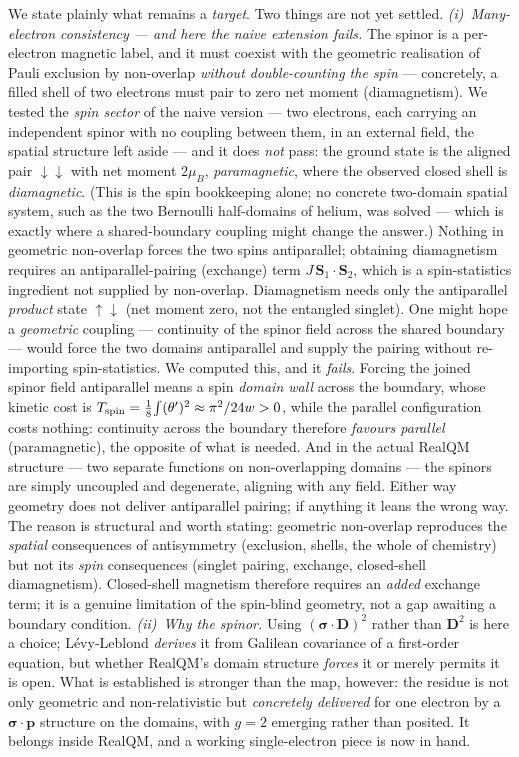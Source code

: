 \documentclass[11pt]{article}
\begin{document}
We state plainly what remains a \emph{target}. Two things are not yet settled. \emph{(i)~Many-electron
consistency --- and here the naive extension fails.} The spinor is a per-electron magnetic label, and it
must coexist with the geometric realisation of Pauli exclusion by non-overlap \emph{without double-counting
the spin} --- concretely, a filled shell of two electrons must pair to zero net moment (diamagnetism). We
tested the \emph{spin sector} of the naive version --- two electrons, each carrying an independent spinor
with no coupling between them, in an external field, the spatial structure left aside --- and it does
\emph{not} pass: the ground state is the aligned pair $\downarrow\downarrow$ with net moment
$2\mu_B$, \emph{paramagnetic}, where the observed closed shell is \emph{diamagnetic}. (This is the spin
bookkeeping alone; no concrete two-domain spatial system, such as the two Bernoulli half-domains of
helium, was solved --- which is exactly where a shared-boundary coupling might change the answer.) Nothing in
geometric non-overlap forces the two spins antiparallel; obtaining diamagnetism requires an
antiparallel-pairing (exchange) term $J\,\mathbf S_1\!\cdot\!\mathbf S_2$, which is a spin-statistics
ingredient not supplied by non-overlap. Diamagnetism needs only the antiparallel \emph{product} state
$\uparrow\downarrow$ (net moment zero, not the entangled singlet). One might hope a \emph{geometric}
coupling --- continuity of the spinor field across the shared boundary --- would force the two domains
antiparallel and supply the pairing without re-importing spin-statistics. We computed this, and it
\emph{fails}. Forcing the joined spinor field antiparallel means a spin \emph{domain wall} across the
boundary, whose kinetic cost is $T_{\rm spin}=\tfrac18\!\int(\theta')^2 \approx \pi^2/24w > 0$, while the
parallel configuration costs nothing: continuity across the boundary therefore \emph{favours parallel}
(paramagnetic), the opposite of what is needed. And in the actual RealQM structure --- two separate
functions on non-overlapping domains --- the spinors are simply uncoupled and degenerate, aligning with
any field. Either way geometry does not deliver antiparallel pairing; if anything it leans the wrong way.
The reason is structural and worth stating: geometric non-overlap reproduces the \emph{spatial}
consequences of antisymmetry (exclusion, shells, the whole of chemistry) but not its \emph{spin}
consequences (singlet pairing, exchange, closed-shell diamagnetism). Closed-shell magnetism therefore
requires an \emph{added} exchange term; it is a genuine limitation of the spin-blind geometry, not a gap
awaiting a boundary condition. \emph{(ii)~Why the spinor.} Using
$(\boldsymbol\sigma\cdot\mathbf D)^2$ rather than $\mathbf D^2$ is here a choice; Lévy-Leblond
\emph{derives} it from Galilean covariance of a first-order equation, but whether RealQM's domain
structure \emph{forces} it or merely permits it is open. What is established is stronger than the map,
however: the residue is not only geometric and non-relativistic but \emph{concretely delivered} for one
electron by a $\boldsymbol\sigma\cdot\mathbf p$ structure on the domains, with $g=2$ emerging rather than
posited. It belongs inside RealQM, and a working single-electron piece is now in hand.
\end{document}
